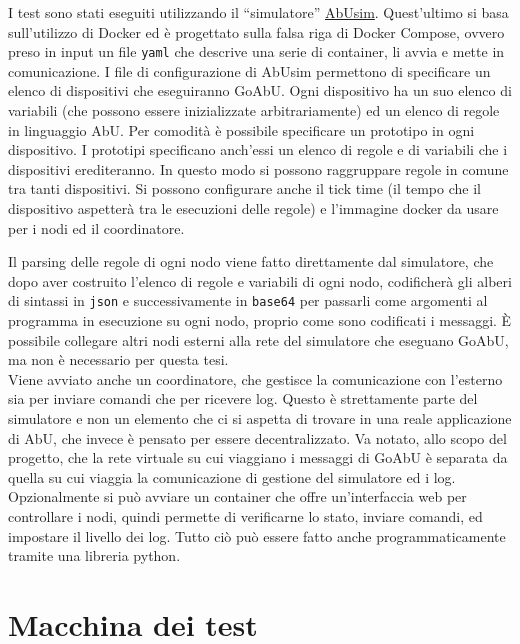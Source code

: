 \documentclass[target=bach]{thud}
\begin{document}
I test sono stati eseguiti utilizzando il ``simulatore'' \href{https://github.com/abu-lang/abusim}{AbUsim}. Quest'ultimo si basa sull'utilizzo di Docker ed è progettato sulla falsa riga di Docker Compose, ovvero preso in input un file \lstinline{yaml} che descrive una serie di container, li avvia e mette in comunicazione.
I file di configurazione di AbUsim permettono di specificare un elenco di dispositivi che eseguiranno GoAbU. Ogni dispositivo ha un suo elenco di variabili (che possono essere inizializzate arbitrariamente) ed un elenco di regole in linguaggio AbU.
Per comodità è possibile specificare un prototipo in ogni dispositivo. I prototipi specificano anch'essi un elenco di regole e di variabili che i dispositivi erediteranno. In questo modo si possono raggruppare regole in comune tra tanti dispositivi.
Si possono configurare anche il tick time (il tempo che il dispositivo aspetterà tra le esecuzioni delle regole) e l'immagine docker da usare per i nodi ed il coordinatore.

Il parsing delle regole di ogni nodo viene fatto direttamente dal simulatore, che dopo aver costruito l'elenco di regole e variabili di ogni nodo, codificherà gli alberi di sintassi in \lstinline{json} e successivamente in \lstinline{base64} per passarli come argomenti al programma in esecuzione su ogni nodo, proprio come sono codificati i messaggi. È possibile collegare altri nodi esterni alla rete del simulatore che eseguano GoAbU, ma non è necessario per questa tesi.\\
Viene avviato anche un coordinatore, che gestisce la comunicazione con l'esterno sia per inviare comandi che per ricevere log. Questo è strettamente parte del simulatore e non un elemento che ci si aspetta di trovare in una reale applicazione di AbU, che invece è pensato per essere decentralizzato. Va notato, allo scopo del progetto, che la rete virtuale su cui viaggiano i messaggi di GoAbU è separata da quella su cui viaggia la comunicazione di gestione del simulatore ed i log.\\
Opzionalmente si può avviare un container che offre un'interfaccia web per controllare i nodi, quindi permette di verificarne lo stato, inviare comandi, ed impostare il livello dei log. Tutto ciò può essere fatto anche programmaticamente tramite una libreria python.

\section{Macchina dei test}
\end{document}
